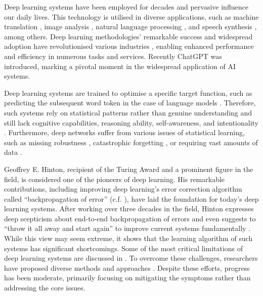 Deep learning systems have been employed for decades \cite{ivakhnenko_cybernetic_1965} and pervasive influence our daily lives. This technology is utilised in diverse applications, such as machine translation \cite{dabre_survey_2021}, image analysis \cite{bhatt_cnn_2021}, natural language processing \cite{otter_survey_2021}, and speech synthesis \cite{ning_review_2019}, among others. Deep learning methodologies' remarkable success and widespread adoption have revolutionised various industries , enabling enhanced performance and efficiency in numerous tasks and services.
Recently ChatGPT  was introduced, marking a pivotal moment in the widespread application of AI systems.

Deep learning systems are trained to optimise a specific target function, such as predicting the subsequent word token in the case of language models .
Therefore, such systems rely on statistical patterns rather than genuine understanding and still lack cognitive capabilities, reasoning ability, self-awareness, and intentionality .
Furthermore, deep networks suffer from various issues of statistical learning, such as missing robustness , catastrophic forgetting , or requiring vast amounts of data .

Geoffrey E. Hinton, recipient of the Turing Award and a prominent figure in the field, is considered one of the pioneers of deep learning.
His remarkable contributions, including improving deep learning's error correction algorithm called ``backpropagation of error''   (c.f. ), have laid the foundation for today's deep learning systems.
After working over three decades in the field, Hinton expresses deep scepticism about end-to-end backpropagation of errors and even suggests to ``throw it all away and start again'' to improve current systems fundamentally .
While this view may seem extreme, it shows that the learning algorithm of such systems has significant shortcomings.
Some of the most critical limitations of deep learning systems are discussed in .
To overcome these challenges, researchers have proposed diverse methods and approaches \cite{long_survey_2022, sager_unsupervised_2022, yarats_improving_2021}. Despite these efforts, progress has been moderate, primarily focusing on mitigating the symptoms rather than addressing the core issues.

